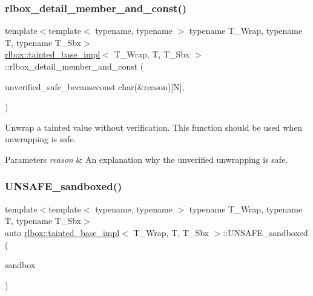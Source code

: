 \subsubsection{\texorpdfstring{rlbox\+\_\+detail\+\_\+member\+\_\+and\+\_\+const()}{rlbox\_detail\_member\_and\_const()}}
{\footnotesize\ttfamily template$<$template$<$ typename, typename $>$ typename T\+\_\+\+Wrap, typename T, typename T\+\_\+\+Sbx$>$ \\
\hyperlink{classrlbox_1_1tainted__base__impl}{rlbox\+::tainted\+\_\+base\+\_\+impl}$<$ T\+\_\+\+Wrap, T, T\+\_\+\+Sbx $>$\+::rlbox\+\_\+detail\+\_\+member\+\_\+and\+\_\+const (\begin{DoxyParamCaption}\item[{template$<$ size\+\_\+t N $>$ inline auto }]{unverified\+\_\+safe\+\_\+becauseconst char(\&reason)\mbox{[}\+N\mbox{]},  }\item[{\{ R\+L\+B\+O\+X\+\_\+\+U\+N\+U\+S\+ED(reason);static\+\_\+assert(!std\+::is\+\_\+pointer\+\_\+v$<$ T $>$, \char`\"{}unverified\+\_\+safe\+\_\+because does not support pointers. Use \char`\"{} \char`\"{}unverified\+\_\+safe\+\_\+pointer\+\_\+because.\char`\"{});return \hyperlink{classrlbox_1_1tainted__base__impl_a01acab6b4bd8137afa03cf4b2678844f}{U\+N\+S\+A\+F\+E\+\_\+unverified}();\}}]{ }\end{DoxyParamCaption})}



Unwrap a tainted value without verification. This function should be used when unwrapping is safe. 


\begin{DoxyParams}{Parameters}
{\em reason} & An explanation why the unverified unwrapping is safe. \\
\hline
\end{DoxyParams}
\mbox{\label{classrlbox_1_1tainted__base__impl_ae2c69129cbb9344e7d2623129f031214}} 
\subsubsection{\texorpdfstring{U\+N\+S\+A\+F\+E\+\_\+sandboxed()}{UNSAFE\_sandboxed()}}
{\footnotesize\ttfamily template$<$template$<$ typename, typename $>$ typename T\+\_\+\+Wrap, typename T, typename T\+\_\+\+Sbx$>$ \\
auto \hyperlink{classrlbox_1_1tainted__base__impl}{rlbox\+::tainted\+\_\+base\+\_\+impl}$<$ T\+\_\+\+Wrap, T, T\+\_\+\+Sbx $>$\+::U\+N\+S\+A\+F\+E\+\_\+sandboxed (\begin{DoxyParamCaption}\item[{\hyperlink{classrlbox_1_1rlbox__sandbox}{rlbox\+\_\+sandbox}$<$ T\+\_\+\+Sbx $>$ \&}]{sandbox }\end{DoxyParamCaption})\hspace{0.3cm}{\ttfamily [inline]}}



